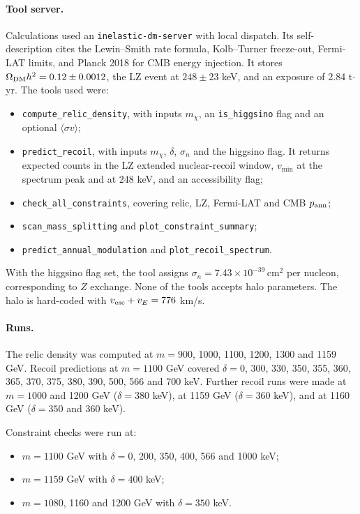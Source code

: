 \documentclass[11pt,a4paper]{article}
\begin{document}
\paragraph{Tool server.} Calculations used an \texttt{inelastic-dm-server} with local dispatch. Its self-description cites the Lewin--Smith rate formula, Kolb--Turner freeze-out, Fermi-LAT limits, and Planck 2018 for CMB energy injection. It stores $\Omega_{\rm DM}h^2 = 0.12\pm0.0012$, the LZ event at $248\pm23$ keV, and an exposure of 2.84 t$\cdot$yr. The tools used were:
\begin{itemize}
\item \texttt{compute\_relic\_density}, with inputs $m_\chi$, an \texttt{is\_higgsino} flag and an optional $\langle\sigma v\rangle$;
\item \texttt{predict\_recoil}, with inputs $m_\chi$, $\delta$, $\sigma_n$ and the higgsino flag. It returns expected counts in the LZ extended nuclear-recoil window, $v_{\min}$ at the spectrum peak and at 248 keV, and an accessibility flag;
\item \texttt{check\_all\_constraints}, covering relic, LZ, Fermi-LAT and CMB $p_{\rm ann}$;
\item \texttt{scan\_mass\_splitting} and \texttt{plot\_constraint\_summary};
\item \texttt{predict\_annual\_modulation} and \texttt{plot\_recoil\_spectrum}.
\end{itemize}
With the higgsino flag set, the tool assigns $\sigma_n = 7.43\times10^{-39}\,\mathrm{cm^2}$ per nucleon, corresponding to $Z$ exchange. None of the tools accepts halo parameters. The halo is hard-coded with $v_{\rm esc}+v_E = 776$ km/s.

\paragraph{Runs.} The relic density was computed at $m = 900$, 1000, 1100, 1200, 1300 and 1159 GeV. Recoil predictions at $m = 1100$ GeV covered $\delta = 0$, 300, 330, 350, 355, 360, 365, 370, 375, 380, 390, 500, 566 and 700 keV. Further recoil runs were made at $m = 1000$ and 1200 GeV ($\delta = 380$ keV), at 1159 GeV ($\delta = 360$ keV), and at 1160 GeV ($\delta = 350$ and 360 keV).

Constraint checks were run at:
\begin{itemize}
\item $m = 1100$ GeV with $\delta = 0$, 200, 350, 400, 566 and 1000 keV;
\item $m = 1159$ GeV with $\delta = 400$ keV;
\item $m = 1080$, 1160 and 1200 GeV with $\delta = 350$ keV.
\end{itemize}
\end{document}
